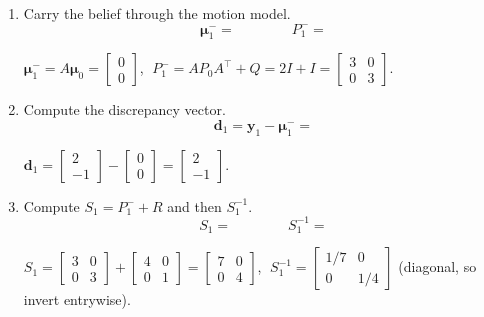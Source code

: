 \documentclass[11pt]{article}
\begin{document}
\begin{enumerate}
  \item Carry the belief through the motion model.
  \[
  \boldsymbol{\mu}_1^- =
  \qquad\qquad
  P_1^- =
  \]

  \vspace{2.5em}

  \begin{solution}
  $\boldsymbol{\mu}_1^-=A\boldsymbol{\mu}_0=\begin{bmatrix}0\\0\end{bmatrix}$,
  $\;P_1^-=AP_0A^\top+Q=2I+I=\begin{bmatrix}3&0\\0&3\end{bmatrix}$.
  \end{solution}

  \item Compute the discrepancy vector.
  \[
  \mathbf{d}_1 = \mathbf{y}_1-\boldsymbol{\mu}_1^- =
  \]

  \vspace{2.0em}

  \begin{solution}
  $\mathbf{d}_1=\begin{bmatrix}2\\-1\end{bmatrix}-\begin{bmatrix}0\\0\end{bmatrix}
   =\begin{bmatrix}2\\-1\end{bmatrix}$.
  \end{solution}

  \item Compute $S_1=P_1^-+R$ and then $S_1^{-1}$.
  \[
  S_1 =
  \qquad\qquad
  S_1^{-1} =
  \]

  \vspace{2.5em}

  \begin{solution}
  $S_1=\begin{bmatrix}3&0\\0&3\end{bmatrix}+\begin{bmatrix}4&0\\0&1\end{bmatrix}
   =\begin{bmatrix}7&0\\0&4\end{bmatrix}$,
  $\;S_1^{-1}=\begin{bmatrix}1/7&0\\0&1/4\end{bmatrix}$ (diagonal, so invert
  entrywise).
  \end{solution}


\end{enumerate}
\end{document}
